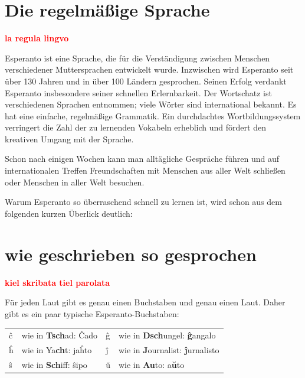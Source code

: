 \section{Die regelmäßige Sprache}

\vspace{-.4cm}

\begin{flushright}
\textbf{\large \textcolor{red}{la regula lingvo}}
\end{flushright}

\vspace{-.2cm}

Esperanto ist eine Sprache, die für die Verständigung zwischen Menschen verschiedener Muttersprachen entwickelt wurde. Inzwischen wird Esperanto seit über 130 Jahren und in über 100 Ländern gesprochen. Seinen Erfolg verdankt Esperanto insbesondere seiner schnellen Erlernbarkeit. Der Wortschatz ist verschiedenen Sprachen entnommen; viele Wörter sind international bekannt. Es hat eine einfache, regelmäßige Grammatik. Ein durchdachtes Wortbildungssystem verringert die Zahl der zu lernenden Vokabeln erheblich und fördert den kreativen Umgang mit der Sprache.

Schon nach einigen Wochen kann man alltägliche Gespräche führen und auf internationalen Treffen Freundschaften mit Menschen aus aller Welt schließen oder Menschen in aller Welt besuchen.

Warum Esperanto so überraschend schnell zu lernen ist, wird schon aus dem folgenden kurzen Überlick deutlich:

\vspace{-.4cm}

\section{wie geschrieben so gesprochen}

\vspace{-.2cm}

\begin{flushright}
\textbf{\large \textcolor{red}{kiel skribata tiel parolata}}
\end{flushright}

\vspace{-.2cm}

Für jeden Laut gibt es genau einen Buchstaben und genau einen Laut. Daher gibt es ein paar typische Esperanto-Buchstaben:

\begin{tabular}{llll}
		ĉ & wie in \textbf{Tsch}ad: Ĉado & ĝ & 
		wie in \textbf{Dsch}ungel: \textbf{ĝ}angalo\\
		ĥ & wie in Ya\textbf{ch}t: jaĥto & ĵ & 
		wie in \textbf{J}ournalist: \textbf{ĵ}urnalisto\\
		ŝ & wie in \textbf{Sch}iff: ŝipo & ŭ & 
		wie in \textbf{Au}to: a\textbf{ŭ}to
\end{tabular}



